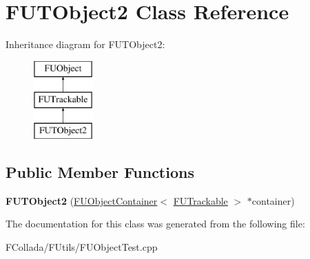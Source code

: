 \hypertarget{classFUTObject2}{
\section{FUTObject2 Class Reference}
\label{classFUTObject2}
}
Inheritance diagram for FUTObject2:\begin{figure}[H]
\begin{center}
\leavevmode
\includegraphics[height=3.000000cm]{classFUTObject2}
\end{center}
\end{figure}
\subsection*{Public Member Functions}
\begin{DoxyCompactItemize}
\item 
\hypertarget{classFUTObject2_a3f338e65a350a218564cfba9c3e75ef4}{
{\bfseries FUTObject2} (\hyperlink{classFUObjectContainer}{FUObjectContainer}$<$ \hyperlink{classFUTrackable}{FUTrackable} $>$ $\ast$container)}
\label{classFUTObject2_a3f338e65a350a218564cfba9c3e75ef4}

\end{DoxyCompactItemize}


The documentation for this class was generated from the following file:\begin{DoxyCompactItemize}
\item 
FCollada/FUtils/FUObjectTest.cpp\end{DoxyCompactItemize}
